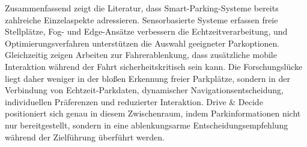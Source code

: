 
Zusammenfassend zeigt die Literatur, dass Smart-Parking-Systeme bereits zahlreiche Einzelaspekte adressieren. Sensorbasierte Systeme erfassen freie Stellplätze, Fog- und Edge-Ansätze verbessern die Echtzeitverarbeitung, und Optimierungsverfahren unterstützen die Auswahl geeigneter Parkoptionen. Gleichzeitig zeigen Arbeiten zur Fahrerablenkung, dass zusätzliche mobile Interaktion während der Fahrt sicherheitskritisch sein kann. Die Forschungslücke liegt daher weniger in der bloßen Erkennung freier Parkplätze, sondern in der Verbindung von Echtzeit-Parkdaten, dynamischer Navigationsentscheidung, individuellen Präferenzen und reduzierter Interaktion. Drive \& Decide positioniert sich genau in diesem Zwischenraum, indem Parkinformationen nicht nur bereitgestellt, sondern in eine ablenkungsarme Entscheidungsempfehlung während der Zielführung überführt werden.








